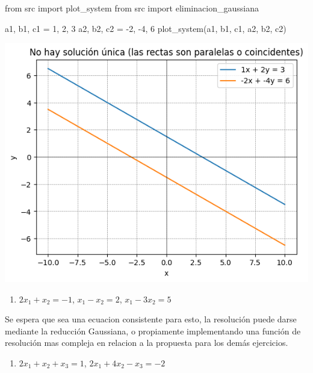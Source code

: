 \documentclass[
  letterpaper,
  DIV=11,
  numbers=noendperiod]{scrartcl}
\newenvironment{Shaded}{\begin{snugshade}}{\end{snugshade}}
\newcommand{\DecValTok}[1]{\textcolor[rgb]{0.68,0.00,0.00}{#1}}
\newcommand{\ImportTok}[1]{\textcolor[rgb]{0.00,0.46,0.62}{#1}}
\newcommand{\NormalTok}[1]{\textcolor[rgb]{0.00,0.23,0.31}{#1}}
\newcommand{\OperatorTok}[1]{\textcolor[rgb]{0.37,0.37,0.37}{#1}}
\providecommand{\tightlist}{%
  \setlength{\itemsep}{0pt}\setlength{\parskip}{0pt}}\usepackage{longtable,booktabs,array}
\begin{document}
\begin{Shaded}
\begin{Highlighting}[]
\ImportTok{from}\NormalTok{ src }\ImportTok{import}\NormalTok{ plot\_system}
\ImportTok{from}\NormalTok{ src }\ImportTok{import}\NormalTok{ eliminacion\_gaussiana}

\NormalTok{a1, b1, c1 }\OperatorTok{=} \DecValTok{1}\NormalTok{, }\DecValTok{2}\NormalTok{, }\DecValTok{3}
\NormalTok{a2, b2, c2 }\OperatorTok{=} \OperatorTok{{-}}\DecValTok{2}\NormalTok{, }\OperatorTok{{-}}\DecValTok{4}\NormalTok{, }\DecValTok{6}
\NormalTok{plot\_system(a1, b1, c1, a2, b2, c2)}
\end{Highlighting}
\end{Shaded}

\includegraphics{tarea9_files/figure-pdf/cell-3-output-1.png}

\begin{enumerate}
\def\labelenumi{\alph{enumi}.}
\setcounter{enumi}{2}
\tightlist
\item
  \(2x_1 + x_2 = -1\), \(x_1 - x_2 = 2\), \(x_1-3x_2=5\)
\end{enumerate}

Se espera que sea una ecuacion consistente para esto, la resolución
puede darse mediante la reducción Gaussiana, o propiamente implementando
una función de resolución mas compleja en relacion a la propuesta para
los demás ejercicios.

\begin{enumerate}
\def\labelenumi{\alph{enumi}.}
\setcounter{enumi}{3}
\tightlist
\item
  \(2x_1 + x_2 + x_3 = 1\), \(2x_1 + 4x_2 - x_3 = -2\)
\end{enumerate}
\end{document}
